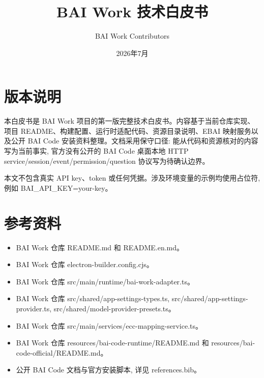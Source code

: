 \documentclass[UTF8,openany,zihao=-4]{ctexbook}
\title{BAI Work 技术白皮书}
\author{BAI Work Contributors}
\date{2026年7月}
\begin{document}
\maketitle
\frontmatter
\chapter*{版本说明}
本白皮书是 BAI Work 项目的第一版完整技术白皮书。内容基于当前仓库实现、项目 README、构建配置、运行时适配代码、资源目录说明、EBAI 映射服务以及公开 BAI Code 安装资料整理。文档采用保守口径: 能从代码和资源核对的内容写为当前事实, 官方没有公开的 BAI Code 桌面本地 HTTP service/session/event/permission/question 协议写为待确认边界。

本文不包含真实 API key、token 或任何凭据。涉及环境变量的示例均使用占位符, 例如 BAI\_API\_KEY=your-key。

\tableofcontents
\mainmatter


















\backmatter
\chapter{参考资料}
\begin{itemize}
  \item BAI Work 仓库 README.md 和 README.en.md。
  \item BAI Work 仓库 electron-builder.config.cjs。
  \item BAI Work 仓库 src/main/runtime/bai-work-adapter.ts。
  \item BAI Work 仓库 src/shared/app-settings-types.ts, src/shared/app-settings-provider.ts, src/shared/model-provider-presets.ts。
  \item BAI Work 仓库 src/main/services/ecc-mapping-service.ts。
  \item BAI Work 仓库 resources/bai-code-runtime/README.md 和 resources/bai-code-official/README.md。
  \item 公开 BAI Code 文档与官方安装脚本, 详见 references.bib。
\end{itemize}
\end{document}
